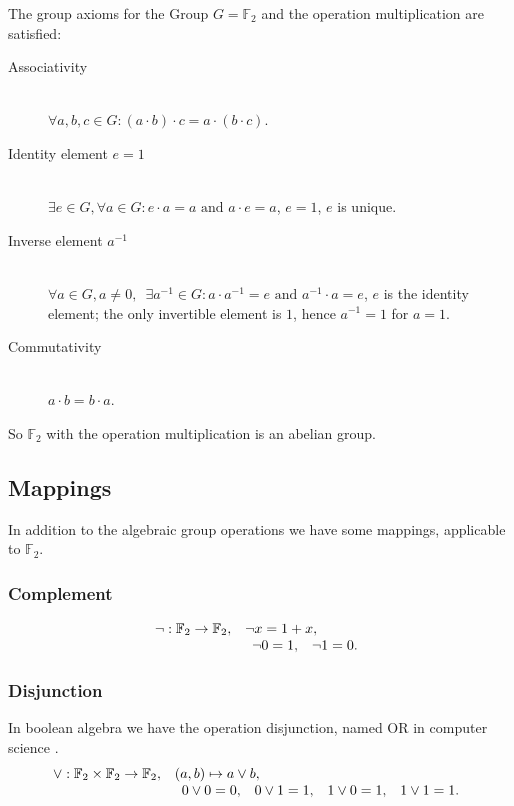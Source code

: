 \documentclass[a4paper]{article}
\newcommand{\BF}{\mathbb{F}}
\newcommand{\0}{\mathbf{0}}
\newcommand{\1}{\mathbf{1}}
\begin{document}
The group axioms for the Group $G = \BF_2$ and the operation multiplication are satisfied:
\begin{description}
\item[Associativity] \ \\
$\forall a, b, c \in G: (a \cdot b) \cdot c = a \cdot (b \cdot c)$.
\item[Identity element $e = 1$] \ \\
$\exists e \in G, \forall a \in G: e \cdot a = a \text{ and } a \cdot e = a$, $e= 1$, $e$ is unique.
\item[Inverse element $a^{-1}$] \ \\
$\forall a \in G, a \ne 0, \enspace \exists a^{-1} \in G : a \cdot a^{-1} = e \text{ and } a^{-1} \cdot a = e$, $e$ is the identity element; the only invertible element is $1$, hence $a^{-1} = 1$ for $a = 1$.
\item[Commutativity] \ \\
$a \cdot b = b \cdot a$.
\end{description}
So $\BF_2$ with the operation multiplication is an abelian group.

\subsection{Mappings}

In addition to the algebraic group operations we have some mappings, applicable to $\BF_2$.

\subsubsection{Complement}
\begin{equation}
\begin{array}{ll}
\neg : \BF_2 \rightarrow \BF_2, & \neg x = 1 + x, \\
& \begin{array}{l l l l}
\neg 0 = 1, & \neg 1 = 0. \\
\end{array}
\end{array}
\end{equation}

\subsubsection{Disjunction}
In boolean algebra we have the operation disjunction, named OR in computer science \cite{knuth:taocp_v4_f0, wikipedia_en_2025_InclusiveOr}.
\begin{equation}
\begin{array}{ll}
\vee : \BF_2 \times \BF_2 \rightarrow \BF_2, & (a, b) \mapsto a \vee b, \\
& \begin{array}{l l l l}
0 \vee 0 = 0, & 0 \vee 1 = 1, & 1 \vee 0 = 1, & 1 \vee 1 = 1. \\
\end{array}
\end{array}
\label{def:booleanoperation}
\end{equation}
\end{document}
